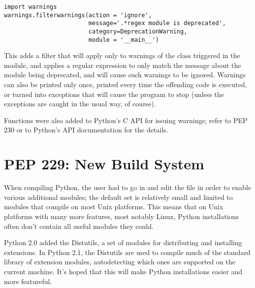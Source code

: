 \documentclass{howto}
\begin{document}
\begin{verbatim}
import warnings
warnings.filterwarnings(action = 'ignore',
                        message='.*regex module is deprecated',
                        category=DeprecationWarning,
                        module = '__main__')
\end{verbatim}

This adds a filter that will apply only to warnings of the class
 triggered in the  module,
and applies a regular expression to only match the message about the
 module being deprecated, and will cause such warnings
to be ignored.  Warnings can also be printed only once, printed every
time the offending code is executed, or turned into exceptions that
will cause the program to stop (unless the exceptions are caught in
the usual way, of course).

Functions were also added to Python's C API for issuing warnings;
refer to PEP 230 or to Python's API documentation for the details.

\begin{seealso} 



\end{seealso}
    
\section{PEP 229: New Build System}

When compiling Python, the user had to go in and edit the
 file in order to enable various additional
modules; the default set is relatively small and limited to modules
that compile on most Unix platforms.  This means that on Unix
platforms with many more features, most notably Linux, Python
installations often don't contain all useful modules they could.

Python 2.0 added the Distutils, a set of modules for distributing and
installing extensions.  In Python 2.1, the Distutils are used to
compile much of the standard library of extension modules,
autodetecting which ones are supported on the current machine.  It's
hoped that this will make Python installations easier and more
featureful.
\end{document}
